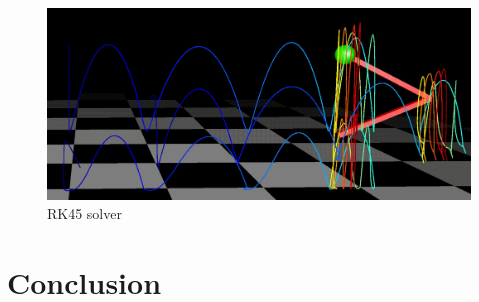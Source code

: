 \documentclass[10pt,conference]{IEEEtran}
\begin{document}
\begin{figure}[h]
   \centering
   \includegraphics[scale=0.074]{"assets/solver_rk45.png"}
   \caption{RK45 solver}
   \label{fig:RK45 solver}
\end{figure}

\section{Conclusion}


\addtolength{\textheight}{-12cm}   %

\nocite{*}


\end{document}
